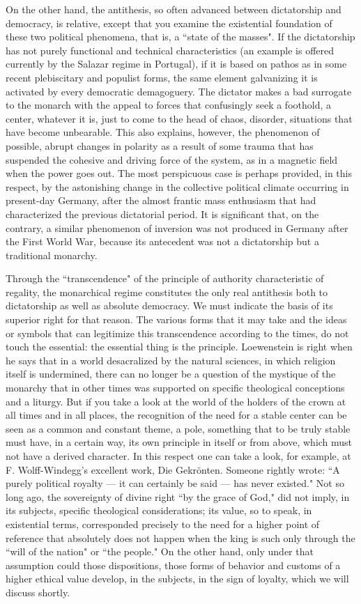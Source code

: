 On the other hand, the antithesis, so often advanced between dictatorship and democracy, is relative, except that you examine the existential foundation of these two political phenomena, that is, a ``state of the masses". If the dictatorship has not purely functional and technical characteristics (an example is offered currently by the Salazar regime in Portugal), if it is based on pathos as in some recent plebiscitary and populist forms, the same element galvanizing it is activated by every democratic demagoguery. The dictator makes a bad surrogate to the monarch with the appeal to forces that confusingly seek a foothold, a center, whatever it is, just to come to the head of chaos, disorder, situations that have become unbearable. This also explains, however, the phenomenon of possible, abrupt changes in polarity as a result of some trauma that has suspended the cohesive and driving force of the system, as in a magnetic field when the power goes out. The most perspicuous case is perhaps provided, in this respect, by the astonishing change in the collective political climate occurring in present-day Germany, after the almost frantic mass enthusiasm that had characterized the previous dictatorial period. It is significant that, on the contrary, a similar phenomenon of inversion was not produced in Germany after the First World War, because its antecedent was not a dictatorship but a traditional monarchy.

Through the ``transcendence" of the principle of authority characteristic of regality, the monarchical regime constitutes the only real antithesis both to dictatorship as well as absolute democracy. We must indicate the basis of its superior right for that reason. The various forms that it may take and the ideas or symbols that can legitimize this transcendence according to the times, do not touch the essential: the essential thing is the principle. Loewenstein is right when he says that in a world desacralized by the natural sciences, in which religion itself is undermined, there can no longer be a question of the mystique of the monarchy that in other times was supported on specific theological conceptions and a liturgy. But if you take a look at the world of the holders of the crown at all times and in all places, the recognition of the need for a stable center can be seen as a common and constant theme, a pole, something that to be truly stable must have, in a certain way, its own principle in itself or from above, which must not have a derived character. In this respect one can take a look, for example, at F. Wolff-Windegg's excellent work, Die Gekrönten. Someone rightly wrote: ``A purely political royalty — it can certainly be said — has never existed." Not so long ago, the sovereignty of divine right ``by the grace of God," did not imply, in its subjects, specific theological considerations; its value, so to speak, in existential terms, corresponded precisely to the need for a higher point of reference that absolutely does not happen when the king is such only through the ``will of the nation" or ``the people." On the other hand, only under that assumption could those dispositions, those forms of behavior and customs of a higher ethical value develop, in the subjects, in the sign of loyalty, which we will discuss shortly.

